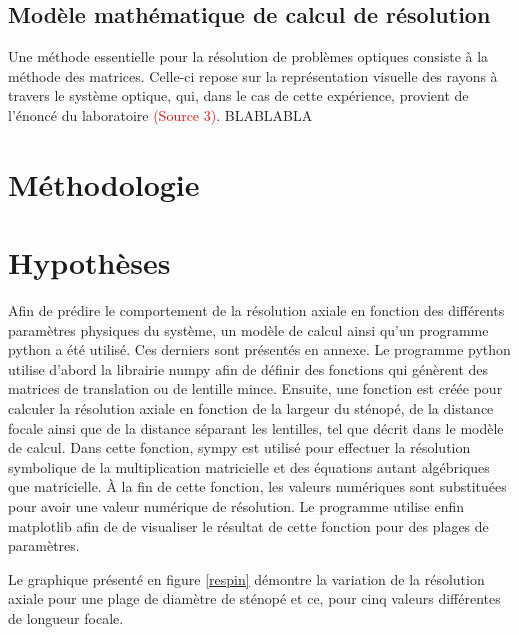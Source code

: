 \documentclass[11pt,letterpaper]{article}
\begin{document}

\subsection{Modèle mathématique de calcul de résolution}
Une méthode essentielle pour la résolution de problèmes optiques consiste à la méthode des matrices. Celle-ci repose sur la représentation visuelle des rayons à travers le système optique, qui, dans le cas de cette expérience, provient de l'énoncé du laboratoire \textcolor{red}{(Source 3)}. BLABLABLA


\section{Méthodologie}

\section{Hypothèses}

Afin de prédire le comportement de la résolution axiale en fonction des différents paramètres physiques du système, un modèle de calcul ainsi qu'un programme python a été utilisé. Ces derniers sont présentés en annexe. Le programme python utilise d'abord la librairie numpy afin de définir des fonctions qui génèrent des matrices de translation ou de lentille mince. Ensuite, une fonction est créée pour calculer la résolution axiale en fonction de la largeur du sténopé, de la distance focale ainsi que de la distance séparant les lentilles, tel que décrit dans le modèle de calcul. Dans cette fonction, sympy est utilisé pour effectuer la résolution symbolique de la multiplication matricielle et des équations autant algébriques que matricielle. À la fin de cette fonction, les valeurs numériques sont substituées pour avoir une valeur numérique de résolution. Le programme utilise enfin matplotlib afin de de visualiser le résultat de cette fonction pour des plages de paramètres.

Le graphique présenté en figure \ref{respin} démontre la variation de la résolution axiale pour une plage de diamètre de sténopé et ce, pour cinq valeurs différentes de longueur focale.
\end{document}
